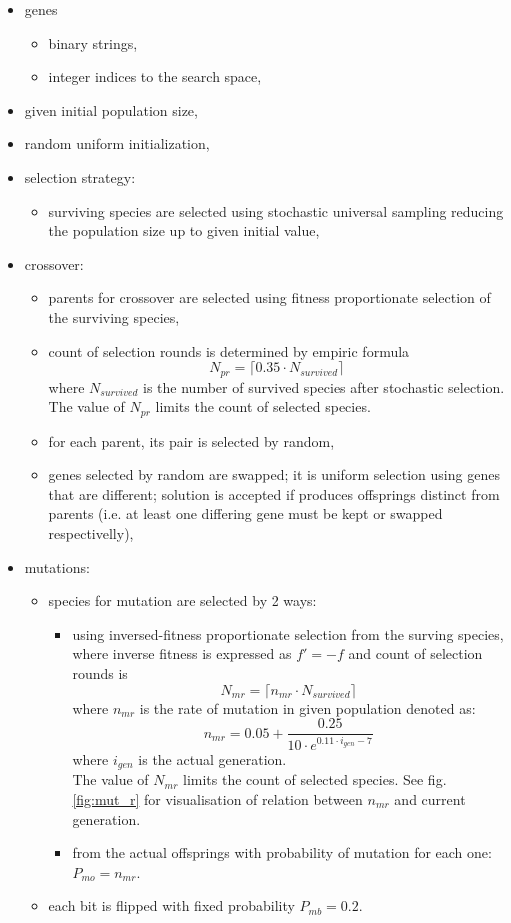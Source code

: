 \documentclass[a4paper,jurnal]{IEEEtran}
\begin{document}
\begin{itemize}
	\item genes 
	\begin{itemize}
		\item binary strings,
		\item integer indices to the search space,
	\end{itemize}
	\item given initial population size,
	\item random uniform initialization,
	\item selection strategy:
	\begin{itemize}
		\item surviving species are selected using stochastic universal 
		sampling reducing the population size up to given initial value,
	\end{itemize}
	\item crossover:
	\begin{itemize}
		\item parents for crossover are selected using fitness proportionate
		selection of the surviving species,
		\item count of selection rounds is determined by empiric formula
		\[ N_{pr} = \lceil 0.35\cdot N_{survived} \rceil \] 		
		where $ N_{survived} $ is the number of survived species after stochastic selection.
		The value of $ N_{pr} $ limits the count of selected species.
		\item for each parent, its pair is selected by random,
		\item genes selected by random are swapped; it is uniform selection using 
		genes that are different; solution is accepted if
		produces  offsprings distinct from parents (i.e. at least one differing gene must be kept or swapped respectivelly),
	\end{itemize}
\end{itemize}
\begin{itemize}
	\item mutations:
	\begin{itemize}
		\item species for mutation are selected by 2 ways:
		\begin{itemize}
			\item using inversed-fitness proportionate
			selection from the surving species, where inverse fitness is expressed as
			$ f'=-f  $
			and count of selection rounds is
			\[ N_{mr} = \lceil n_{mr}\cdot N_{survived} \rceil \]
			where 
			$ n_{mr} $  is the rate of mutation in given population denoted as:			
			\[ n_{mr} = 0.05+\dfrac{0.25}{10\cdot e^{0.11\cdot i_{gen}-7}}\]
			where
			$ i_{gen} $ is the actual generation.\\
			The value of $ N_{mr} $ limits the count of selected species. 
			See fig. \ref{fig:mut_r} for visualisation of relation between $ n_{mr} $ 
			and current generation.
			\item from the actual offsprings with probability of mutation for each one:
			$ P_{mo} = n_{mr} $.
		\end{itemize}
		\item each bit is flipped with fixed probability
		$ P_{mb} = 0.2 $.
	\end{itemize}
\end{itemize}
\end{document}
